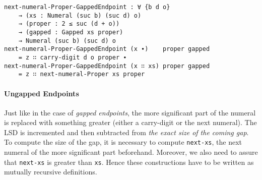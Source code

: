 \documentclass[\main/thesis.tex]{subfiles}
\begin{document}
\begin{lstlisting}[basicstyle=\ttfamily\scriptsize]
next-numeral-Proper-GappedEndpoint : ∀ {b d o}
    → (xs : Numeral (suc b) (suc d) o)
    → (proper : 2 ≤ suc (d + o))
    → (gapped : Gapped xs proper)
    → Numeral (suc b) (suc d) o
next-numeral-Proper-GappedEndpoint (x ∙)    proper gapped
    = z ∷ carry-digit d o proper ∙
next-numeral-Proper-GappedEndpoint (x ∷ xs) proper gapped
    = z ∷ next-numeral-Proper xs proper
\end{lstlisting}

\paragraph{Ungapped Endpoints}

\begin{center}
    \begin{adjustbox}{max width=\textwidth}
    \end{adjustbox}
\end{center}

Just like in the case of \textit{gapped endpoints}, the more significant part
of the numeral is replaced with something greater (either a carry-digit or
the next numeral).
The LSD is incremented and then subtracted from \textit{the exact size of the coming gap}.
To compute the size of the gap, it is necessary to compute {\lstinline|next-xs|},
the next numeral of the more significant part beforehand.
Moreover, we also need to assure that {\lstinline|next-xs|} is greater than
{\lstinline|xs|}.
Hence these constructions have to be written as mutually recursive definitions.
\end{document}
